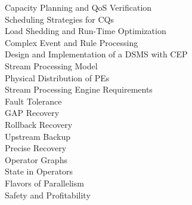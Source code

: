 Capacity Planning and QoS Verification\cite{chakravarthy2009stream}\\


Scheduling Strategies for CQs\cite{chakravarthy2009stream}\\


Load Shedding and Run-Time Optimization\cite{chakravarthy2009stream}\\


Complex Event and Rule Processing\cite{chakravarthy2009stream}\\


Design and Implementation of a DSMS with CEP\cite{chakravarthy2009stream}\\


Stream Processing Model\cite{kamburugamuve2013survey}\\


Physical Distribution of PEs\cite{kamburugamuve2013survey}\\


Stream Processing Engine Requirements\cite{kamburugamuve2013survey}\\


Fault Tolerance\cite{kamburugamuve2013survey}\\


GAP Recovery\cite{kamburugamuve2013survey}\\


Rollback Recovery\cite{kamburugamuve2013survey}\\


Upstream Backup\cite{kamburugamuve2013survey}\\


Precise Recovery\cite{kamburugamuve2013survey}\\



Operator Graphs\cite{schneider2013tutorial}\\


State in Operators\cite{schneider2013tutorial}\\


Flavors of Parallelism\cite{schneider2013tutorial}\\


Safety and Profitability\cite{schneider2013tutorial}\\
